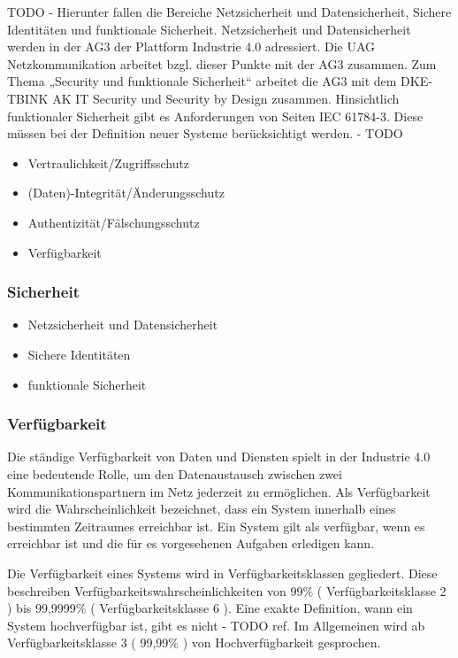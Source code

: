 TODO - Hierunter fallen die Bereiche Netzsicherheit und Datensicherheit, Sichere Identitäten und funktionale Sicherheit. Netzsicherheit und Datensicherheit werden in der AG3 der Plattform Industrie 4.0 adressiert. Die UAG Netzkommunikation arbeitet bzgl. dieser Punkte mit der AG3 zusammen. Zum Thema „Security und funktionale Sicherheit“ arbeitet die AG3 mit dem DKE-TBINK AK IT Security und Security by Design zusammen. Hinsichtlich funktionaler Sicherheit gibt es Anforderungen von Seiten IEC 61784-3. Diese müssen bei der Definition neuer Systeme berücksichtigt werden. - TODO

\begin{itemize}
  \item Vertraulichkeit/Zugriffsschutz
  \item (Daten)-Integrität/Änderungsschutz
  \item Authentizität/Fälschungsschutz
  \item Verfügbarkeit
\end{itemize}

\subsubsection{Sicherheit}
\begin{itemize}
    \item Netzsicherheit und Datensicherheit
    \item Sichere Identitäten
    \item funktionale Sicherheit
\end{itemize}

\subsubsection{Verfügbarkeit}
Die ständige Verfügbarkeit von Daten und Diensten spielt in der Industrie 4.0 eine bedeutende Rolle, um den Datenaustausch zwischen zwei Kommunikationspartnern im Netz jederzeit zu ermöglichen. Als Verfügbarkeit wird die Wahrscheinlichkeit bezeichnet, dass ein System innerhalb eines bestimmten Zeitraumes erreichbar ist. Ein System gilt als verfügbar, wenn es erreichbar ist und die für es vorgesehenen Aufgaben erledigen kann.

Die Verfügbarkeit eines Systems wird in Verfügbarkeitsklassen gegliedert. Diese beschreiben Verfügbarkeitswahrscheinlichkeiten von 99\% ( Verfügbarkeitsklasse 2 ) bis 99,9999\% ( Verfügbarkeitsklasse 6 ). Eine exakte Definition, wann ein System hochverfügbar ist, gibt es nicht - TODO ref. Im Allgemeinen wird ab Verfügbarkeitsklasse 3 ( 99,99\% ) von Hochverfügbarkeit gesprochen.

